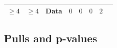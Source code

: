 \begin{landscape}
\begin{center}
\begin{table}[h!]
\begin{tabular}{ llllllllllllll }
    $\geq 4$             & $\geq 4$ & Data & $0$                            & $0$                            & $0$                            & $2$                  & \multicolumn{7}{l}{}                                                                                                                                         \\
    \hline
    \hline
  \end{tabular}
\end{table}
\end{center}
\end{landscape}

\subsection{Pulls and p-values}

